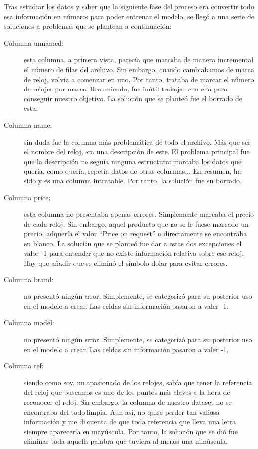 	Tras estudiar los datos y saber que la siguiente fase del proceso era convertir todo esa información en números para poder entrenar el modelo, se llegó a una serie de soluciones a problemas que se plantean a continuación:
	
\begin{description}
	\item[Columna unnamed:] esta columna, a primera vista, parecía que marcaba de manera incremental el número de filas del archivo. Sin embargo, cuando cambiabamos de marca de reloj, volvía a comenzar en uno. Por tanto, trataba de marcar el número de relojes por marca. Resumiendo, fue inútil trabajar con ella para conseguir nuestro objetivo. La solución que se planteó fue el borrado de esta.
	\item[Columna name:] sin duda fue la columna más problemática de todo el archivo. Más que ser el nombre del reloj, era una descripción de este. El problema principal fue que la descripción no seguía ninguna estructura: marcaba los datos que quería, como quería, repetía datos de otras columnas... En resumen, ha sido y es una columna intratable. Por tanto, la solución fue su borrado.
	\item[Columna price:] esta columna no presentaba apenas errores. Simplemente marcaba el precio de cada reloj. Sin embargo, aquel producto que no se le fuese marcado un precio, adquería el valor “Price on request” o directamente se encontraba en blanco. La solución que se planteó fue dar a estas dos excepciones el valor -1 para entender que no existe información relativa sobre ese reloj. Hay que añadir que se eliminó el símbolo dolar para evitar errores.
	\item[Columna brand:] no presentó ningún error. Simplemente, se categorizó para su posterior uso en el modelo a crear. Las celdas sin información pasaron a valer -1.
	\item[Columna model:] no presentó ningún error. Simplemente, se categorizó para su posterior uso en el modelo a crear. Las celdas sin información pasaron a valer -1.
	\item[Columna ref:] siendo como soy, un apasionado de los relojes, sabía que tener la referencia del reloj que buscamos es uno de los puntos más claves a la hora de reconocer el reloj. Sin embargo, la columna de nuestro dataset no se encontraba del todo limpia. Aun así, no quise perder tan valiosa información y me di cuenta de que toda referencia que lleva una letra siempre aparecería en mayúscula. Por tanto, la solución que se dió fue eliminar toda aquella palabra que tuviera al menos una minúscula.

\end{description}
